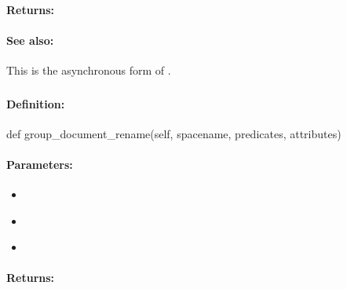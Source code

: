 \paragraph{Returns:}


\paragraph{See also:}  This is the asynchronous form of .

\pagebreak
\subsubsection{}
\label{api:python:group_document_rename}


\paragraph{Definition:}
\begin{pythoncode}
def group_document_rename(self, spacename, predicates, attributes)
\end{pythoncode}

\paragraph{Parameters:}
\begin{itemize}[noitemsep]
\item {}\\

\item {}\\

\item {}\\

\end{itemize}

\paragraph{Returns:}


\pagebreak
